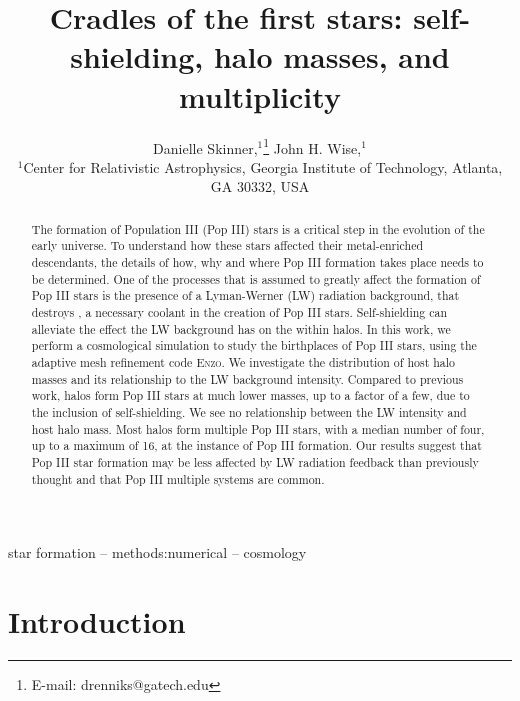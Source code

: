 \documentclass[a4paper,fleqn,usenatbib]{mnras}
\title[Cradles of the first stars]{Cradles of the first stars: self-shielding, halo masses, and multiplicity}
\author[D. Skinner and J.~H. Wise]{
Danielle Skinner,$^{1}$\thanks{E-mail: drenniks@gatech.edu}
John H. Wise,$^{1}$
\\
$^{1}$Center for Relativistic Astrophysics, Georgia Institute of Technology, 
Atlanta, GA 30332, USA\\
}
\begin{document}
\label{firstpage}
\pagerange{\pageref{firstpage}--\pageref{lastpage}}
\maketitle

\begin{abstract}
The formation of Population III (Pop III) stars is a critical step in the evolution of the early universe. To understand how these stars affected their metal-enriched descendants, the details of how, why and where Pop III formation takes place needs to be determined. One of the processes that is assumed to greatly affect the formation of Pop III stars is the presence of a Lyman-Werner (LW) radiation background, that destroys \hh{}, a necessary coolant in the creation of Pop III stars. Self-shielding can alleviate the effect the LW background has on the \hh{} within halos. In this work, we perform a cosmological simulation to study the birthplaces of Pop III stars, using the adaptive mesh refinement code \textsc{Enzo}. We investigate the distribution of host halo masses and its relationship to the LW background intensity. Compared to previous work, halos form Pop III stars at much lower masses, up to a factor of a few, due to the inclusion of \hh{} self-shielding. We see no relationship between the LW intensity and host halo mass. Most halos form multiple Pop III stars, with a median number of four, up to a maximum of 16, at the instance of Pop III formation. Our results suggest that Pop III star formation may be less affected by LW radiation feedback than previously thought and that Pop III multiple systems are common. 
\end{abstract}{}

\begin{keywords}
star formation -- methods:numerical -- cosmology
\end{keywords}


\section{Introduction}
\end{document}
